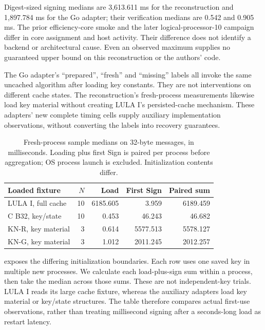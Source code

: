 Digest-sized signing medians are 3,613.611 ms for the reconstruction and 1,897.784 ms for the Go adapter; their verification medians are 0.542 and 0.905 ms. The prior efficiency-core smoke and the later logical-processor-10 campaign differ in core assignment and host activity. Their difference does not identify a backend or architectural cause. Even an observed maximum supplies no guaranteed upper bound on this reconstruction or the authors' code.

The Go adapter's ``prepared'', ``fresh'' and ``missing'' labels all invoke the same uncached algorithm after loading key constants. They are not interventions on different cache states. The reconstruction's fresh-process measurements likewise load key material without creating LULA I's persisted-cache mechanism. These adapters' new complete timing cells supply auxiliary implementation observations, without converting the labels into recovery guarantees.

\begin{table}[t]
\caption{Fresh-process sample medians on 32-byte messages, in milliseconds. Loading plus first Sign is paired per process before aggregation; OS process launch is excluded. Initialization contents differ.}\label{tab:comparison-fresh}
\centering\small
\begin{tabular}{lrrrr}\toprule
Loaded fixture & $N$ & Load & First Sign & Paired sum\\\midrule
LULA I, full cache & 10 & 6185.605 & 3.959 & 6189.459\\
C B32, key/state & 10 & 0.453 & 46.243 & 46.682\\
KN-R, key material & 3 & 0.614 & 5577.513 & 5578.127\\
KN-G, key material & 3 & 1.012 & 2011.245 & 2012.257\\
\bottomrule\end{tabular}
\end{table}
 exposes the differing initialization boundaries. Each row uses one saved key in multiple new processes. We calculate each load-plus-sign sum within a process, then take the median across those sums. These are not independent-key trials. LULA I reads its large cache fixture, whereas the auxiliary adapters load key material or key/state structures. The table therefore compares actual first-use observations, rather than treating millisecond signing after a seconds-long load as restart latency.

